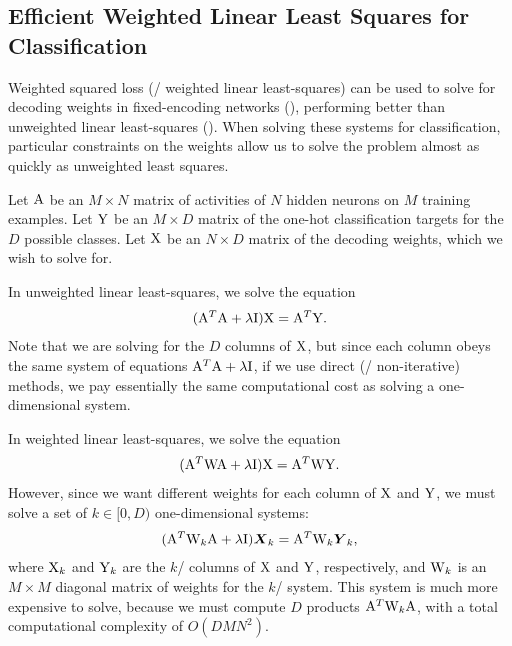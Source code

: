 \begin{appendices}

\chapter{Efficient Weighted Linear Least Squares for Classification}

Weighted squared loss (\aka/ weighted linear least-squares)
can be used to solve for decoding weights
in fixed-encoding networks (),
performing better than unweighted linear least-squares ().
When solving these systems for classification,
particular constraints on the weights
allow us to solve the problem almost as quickly as unweighted least squares.

Let $\mathrm{A}$ be an $M \times N$ matrix of activities of $N$ hidden neurons
on $M$ training examples.
Let $\mathrm{Y}$ be an $M \times D$ matrix of the one-hot classification targets
for the $D$ possible classes.
Let $\mathrm{X}$ be an $N \times D$ matrix of the decoding weights,
which we wish to solve for.

In unweighted linear least-squares, we solve the equation
\begin{align}
  (\mathrm{A}^T \mathrm{A} + \lambda\mathrm{I}) \mathrm{X} = \mathrm{A}^T \mathrm{Y}.
\end{align}
Note that we are solving for the $D$ columns of $\mathrm{X}$,
but since each column obeys the same system of equations
$\mathrm{A}^T \mathrm{A} + \lambda\mathrm{I}$,
if we use direct (\ie/ non-iterative) methods,
we pay essentially the same computational cost as solving a one-dimensional system.

In weighted linear least-squares, we solve the equation
\begin{align}
  (\mathrm{A}^T \mathrm{W} \mathrm{A} + \lambda\mathrm{I}) \mathrm{X} = \mathrm{A}^T \mathrm{W} \mathrm{Y}.
\end{align}
However, since we want different weights for each column of $\mathrm{X}$ and $\mathrm{Y}$,
we must solve a set of $k \in [0, D)$ one-dimensional systems:
\begin{align}
  (\mat A^T \mat W_k \mat A + \lambda\mat I) \vect X_k = \mat A^T \mat W_k \vect Y_k,
  \eqnlabel{weighted-lstsq-systems}
\end{align}
where $\mathrm{X}_k$ and $\mathrm{Y}_k$ are the $k$\sth/ columns of $\mathrm{X}$ and $\mathrm{Y}$, respectively,
and $\mathrm{W}_k$ is an $M \times M$ diagonal matrix of weights for the $k$\sth/ system.
This system is much more expensive to solve, because we must compute $D$
products $\mathrm{A}^T \mathrm{W}_k \mathrm{A}$, with a total computational complexity of $O(DMN^2)$.


\end{appendices}
